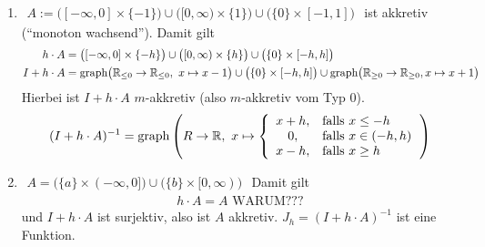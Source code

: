 \begin{beispiel}[Beispiele für $X=\R$]\
\begin{enumerate}[label=(\alph*)]
\item $\begin{aligned}
A:=\big([-\infty,0]\times\lbrace-1\rbrace\big)\cup\big([0,\infty)\times\lbrace 1\rbrace\big)\cup\big(\lbrace0\rbrace\times[-1,1]\big)
\end{aligned}$
ist akkretiv (``monoton wachsend''). Damit gilt
\begin{align*}
h\cdot A&=\big([-\infty,0]\times\lbrace-h\rbrace\big)\cup\big([0,\infty)\times\lbrace h\rbrace\big)\cup\big(\lbrace0\rbrace\times[-h,h]\big)\\
I+h\cdot A&=\text{graph}\big(\mathbb{R}_{\leq0}\to\mathbb{R}_{\leq0},~x\mapsto x-1\big)\cup\big(\lbrace 0\rbrace\times [-h,h]\big)\cup\text{graph}\big(\mathbb{R}_{\geq0}\to\mathbb{R}_{\geq0},x\mapsto x+1\big)
\end{align*}
Hierbei ist $I+h\cdot A$ $m$-akkretiv (also $m$-akkretiv vom Typ 0).
\begin{align*}
(I+h\cdot A)^{-1}=\text{graph}\left(R\to\mathbb{R},~x\mapsto\left\lbrace\begin{array}{cl}
x+h, & \text{falls } x\leq -h\\
0, & \text{falls } x\in(-h,h)\\
x-h, & \text{falls } x\geq h
\end{array}\right.\right)
\end{align*}
\item $\begin{aligned}
A=\big(\lbrace a\rbrace\times (-\infty,0]\big)\cup\big(\lbrace b\rbrace\times[0,\infty)\big)
\end{aligned}$
Damit gilt
\begin{align*}
h\cdot A=A\text{ WARUM???}
\end{align*}
und $I+h\cdot A$ ist surjektiv, also ist $A$ akkretiv. $J_h=(I+h\cdot A)^{-1}$ ist eine Funktion.
\end{enumerate}
\end{beispiel}

